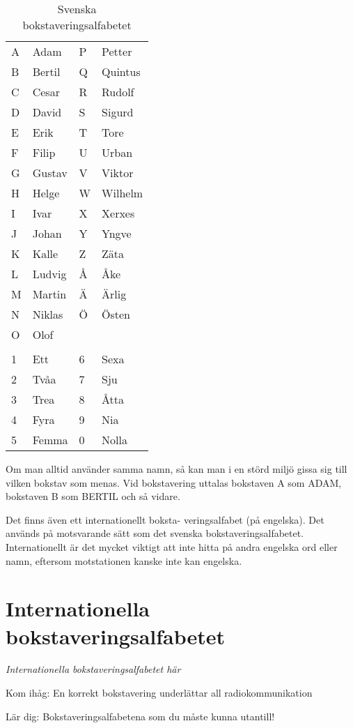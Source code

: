 \begin{table}[h]
  \begin{tabular}{ll|ll}
    A & Adam   & P & Petter  \\
    B & Bertil & Q & Quintus \\
    C & Cesar  & R & Rudolf  \\
    D & David  & S & Sigurd  \\
    E & Erik   & T & Tore    \\
    F & Filip  & U & Urban   \\
    G & Gustav & V & Viktor  \\
    H & Helge  & W & Wilhelm \\
    I & Ivar   & X & Xerxes  \\
    J & Johan  & Y & Yngve   \\
    K & Kalle  & Z & Zäta    \\
    L & Ludvig & Å & Åke     \\
    M & Martin & Ä & Ärlig   \\
    N & Niklas & Ö & Östen   \\
    O & Olof   &   &  \\
    &        &   &  \\
    1 & Ett    & 6 & Sexa    \\
    2 & Tvåa   & 7 & Sju     \\
    3 & Trea   & 8 & Åtta    \\
    4 & Fyra   & 9 & Nia     \\
    5 & Femma  & 0 & Nolla
  \end{tabular}
  \caption{Svenska bokstaveringsalfabetet}
  \label{tab:sv-bokstavering}
\end{table}

Om man alltid använder samma namn,
så kan man i en störd miljö gissa sig till
vilken bokstav som menas.
Vid bokstavering uttalas bokstaven A som
ADAM, bokstaven B som BERTIL och så
vidare.

Det finns även ett internationellt boksta-
veringsalfabet (på engelska). Det används
på motsvarande sätt som det svenska
bokstaveringsalfabetet. Internationellt är det
mycket viktigt att inte hitta på andra engelska
ord eller namn, eftersom motstationen kanske
inte kan engelska.

\section{Internationella bokstaveringsalfabetet}
\emph{Internationella bokstaveringsalfabetet här}

Kom ihåg: En korrekt bokstavering underlättar all radiokommunikation

Lär dig: Bokstaveringsalfabetena som du måste kunna utantill!
